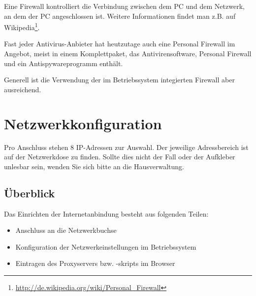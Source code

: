 \documentclass[a4paper,12pt]{scrartcl}
\begin{document}
Eine Firewall kontrolliert die Verbindung zwischen dem PC und dem Netzwerk, an dem der PC angeschlossen ist. Weitere Informationen findet man z.B. auf Wikipedia\footnote{\url{http://de.wikipedia.org/wiki/Personal\_Firewall}}.

Fast jeder Antivirus-Anbieter hat heutzutage auch eine Personal Firewall im Angebot, meist in einem Komplettpaket, das Antivirensoftware, Personal Firewall und ein Antispywareprogramm enthält.

Generell ist die Verwendung der im Betriebssystem integierten Firewall aber ausreichend.

\newpage

\section*{Netzwerkkonfiguration}

Pro Anschluss stehen 8 IP-Adressen zur Auswahl. Der jeweilige Adressbereich ist auf der Netzwerkdose zu finden. Sollte dies nicht der Fall oder der Aufkleber unlesbar sein, wenden Sie sich bitte an die Hausverwaltung.

\subsection*{Überblick}

Das Einrichten der Internetanbindung besteht aus folgenden Teilen:
\begin{itemize}
    \item Anschluss an die Netzwerkbuchse
    \item Konfiguration der Netzwerkeinstellungen im Betriebssystem
    \item Eintragen des Proxyservers bzw. -skripts im Browser
\end{itemize}
\end{document}
